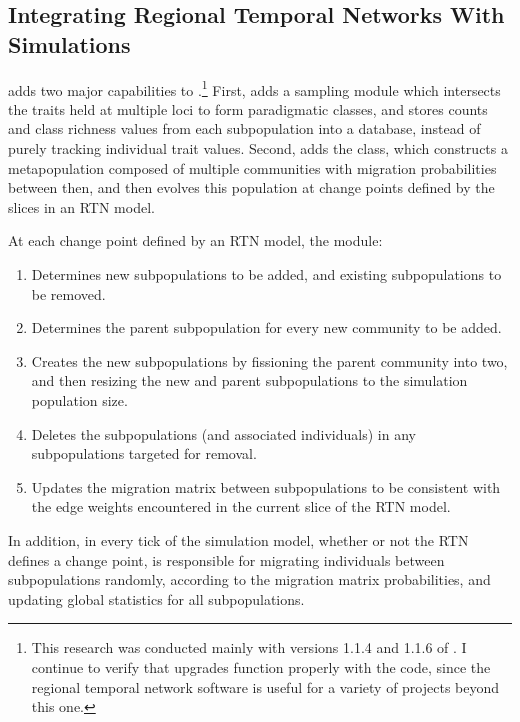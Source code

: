 \subsection{Integrating Regional Temporal Networks With Simulations}

\seriationct adds two major capabilities to \simupop.\footnote{This research was conducted mainly with versions 1.1.4 and 1.1.6 of \simupop.  I continue to verify that \simupop upgrades function properly with the \seriationct code, since the regional temporal network software is useful for a variety of projects beyond this one.}  First, \seriationct adds a sampling module which intersects the traits held at multiple loci to form paradigmatic classes, and stores counts and class richness values from each subpopulation into a database, instead of purely tracking individual trait values.  Second, \seriationct adds the  class, which constructs a metapopulation composed of multiple communities with migration probabilities between then, and then evolves this population at change points defined by the slices in an RTN model.  

At each change point defined by an RTN model, the  module:

\begin{enumerate}[label=\emph{\arabic*})]
	\item Determines new subpopulations to be added, and existing subpopulations to be removed.
	\item Determines the parent subpopulation for every new community to be added.
	\item Creates the new subpopulations by fissioning the parent community into two, and then resizing the new and parent subpopulations to the simulation population size.
	\item Deletes the subpopulations (and associated individuals) in any subpopulations targeted for removal.
	\item Updates the migration matrix between subpopulations to be consistent with the edge weights encountered in the current slice of the RTN model.
\end{enumerate}

In addition, in every tick of the simulation model, whether or not the RTN defines a change point,  is responsible for migrating individuals between subpopulations randomly, according to the migration matrix probabilities, and updating global statistics for all subpopulations.  





